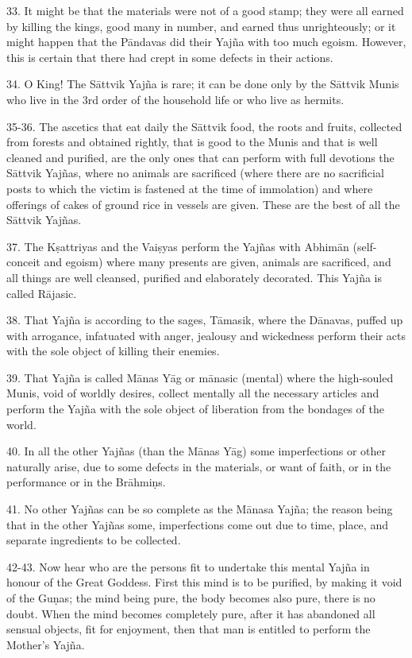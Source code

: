 33. It might be that the materials were not of a good stamp; they were all earned by killing the kings, good many in number, and earned thus unrighteously; or it might happen that the P\=andavas did their Yaj\~na with too much egoism. However, this is certain that there had crept in some defects in their actions.

34. O King! The S\=attvik Yaj\~na is rare; it can be done only by the S\=attvik Munis who live in the 3rd order of the household life or who live as hermits.

35-36. The ascetics that eat daily the S\=attvik food, the roots and fruits, collected from forests and obtained rightly, that is good to the Munis and that is well cleaned and purified, are the only ones that can perform with full devotions the S\=attvik Yaj\~nas, where no animals are sacrificed (where there are no sacrificial posts to which the victim is fastened at the time of immolation) and where offerings of cakes of ground rice in vessels are given. These are the best of all the S\=attvik Yaj\~nas.

37. The K\d{s}attriyas and the Vai\d{s}yas perform the Yaj\~nas with Abhim\=an (self-conceit and egoism) where many presents are given, animals are sacrificed, and all things are well cleansed, purified and elaborately decorated. This Yaj\~na is called R\=ajasic.

38. That Yaj\~na is according to the sages, T\=amasik, where the D\=anavas, puffed up with arrogance, infatuated with anger, jealousy and wickedness perform their acts with the sole object of killing their enemies.

39. That Yaj\~na is called M\=anas Y\=ag or m\=anasic (mental) where the high-souled Munis, void of worldly desires, collect mentally all the necessary articles and perform the Yaj\~na with the sole object of liberation from the bondages of the world.

40. In all the other Yaj\~nas (than the M\=anas Y\=ag) some imperfections or other naturally arise, due to some defects in the materials, or want of faith, or in the performance or in the Br\=ahmi\d{n}s.

41. No other Yaj\~nas can be so complete as the M\=anasa Yaj\~na; the reason being that in the other Yaj\~nas some, imperfections come out due to time, place, and separate ingredients to be collected.

42-43. Now hear who are the persons fit to undertake this mental Yaj\~na in honour of the Great Goddess. First this mind is to be purified, by making it void of the Gu\d{n}as; the mind being pure, the body becomes also pure, there is no doubt. When the mind becomes completely pure, after it has abandoned all sensual objects, fit for enjoyment, then that man is entitled to perform the Mother's Yaj\~na.

